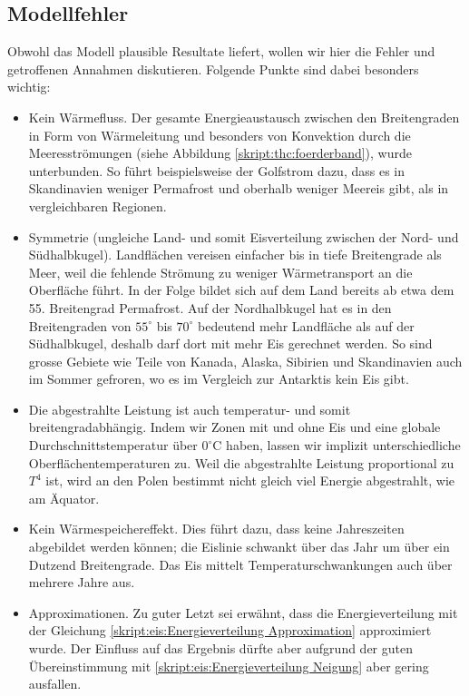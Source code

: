 \begin{refsection}
\section{Modellfehler}
Obwohl das Modell plausible Resultate liefert, wollen wir hier die Fehler und getroffenen Annahmen diskutieren. Folgende Punkte sind dabei besonders wichtig:
\begin{itemize}
	\item Kein Wärmefluss. Der gesamte Energieaustausch zwischen den Breitengraden in Form von Wärmeleitung und besonders von Konvektion durch die Meeresströmungen (siehe Abbildung \ref{skript:thc:foerderband}), wurde unterbunden. So führt beispielsweise der Golfstrom dazu, dass es in Skandinavien weniger Permafrost und oberhalb weniger Meereis gibt, als in vergleichbaren Regionen.
	\item Symmetrie (ungleiche Land- und somit Eisverteilung zwischen der Nord- und Südhalbkugel). Landflächen vereisen einfacher bis in tiefe Breitengrade als Meer, weil die fehlende Strömung zu weniger Wärmetransport an die Oberfläche führt. In der Folge bildet sich auf dem Land bereits ab etwa dem 55. Breitengrad Permafrost. Auf der Nordhalbkugel hat es in den Breitengraden von $55^\circ$ bis $70^\circ$ bedeutend mehr Landfläche als auf der Südhalbkugel, deshalb darf dort mit mehr Eis gerechnet werden. So sind grosse Gebiete wie Teile von Kanada, Alaska, Sibirien und Skandinavien auch im Sommer gefroren, wo es im Vergleich zur Antarktis kein Eis gibt.
	\item Die abgestrahlte Leistung ist auch temperatur- und somit breitengradabhängig. Indem wir Zonen mit und ohne Eis und eine globale Durchschnittstemperatur über $0^\circ\text{C}$ haben, lassen wir implizit unterschiedliche Oberflächentemperaturen zu. Weil die abgestrahlte Leistung proportional zu $T^4$ ist, wird an den Polen bestimmt nicht gleich viel Energie abgestrahlt, wie am Äquator.
	\item Kein Wärmespeichereffekt. Dies führt dazu, dass keine Jahreszeiten abgebildet werden können; die Eislinie schwankt über das Jahr um über ein Dutzend Breitengrade. Das Eis mittelt Temperaturschwankungen auch über mehrere Jahre aus.
	\item Approximationen. Zu guter Letzt sei erwähnt, dass die Energieverteilung mit der Gleichung \eqref{skript:eis:Energieverteilung Approximation} approximiert wurde. Der Einfluss auf das Ergebnis dürfte aber aufgrund der guten Übereinstimmung mit \eqref{skript:eis:Energieverteilung Neigung} aber gering ausfallen.
\end{itemize}

\end{refsection}
